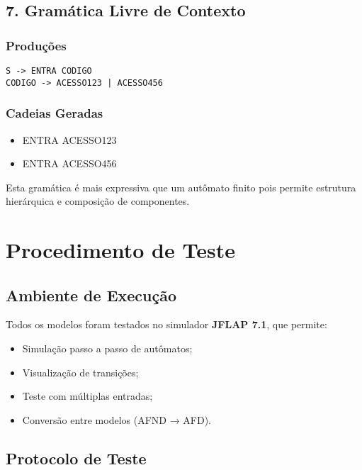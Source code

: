 \documentclass[12pt,a4paper]{article}
\begin{document}
\subsection{7. Gramática Livre de Contexto}

\subsubsection{Produções}

\begin{lstlisting}
S -> ENTRA CODIGO
CODIGO -> ACESSO123 | ACESSO456
\end{lstlisting}

\subsubsection{Cadeias Geradas}

\begin{itemize}
    \item ENTRA ACESSO123
    \item ENTRA ACESSO456
\end{itemize}

Esta gramática é mais expressiva que um autômato finito pois permite estrutura hierárquica e composição de componentes.

\newpage

\section{Procedimento de Teste}

\subsection{Ambiente de Execução}

Todos os modelos foram testados no simulador \textbf{JFLAP 7.1}, que permite:
\begin{itemize}
    \item Simulação passo a passo de autômatos;
    \item Visualização de transições;
    \item Teste com múltiplas entradas;
    \item Conversão entre modelos (AFND → AFD).
\end{itemize}

\subsection{Protocolo de Teste}
\end{document}
